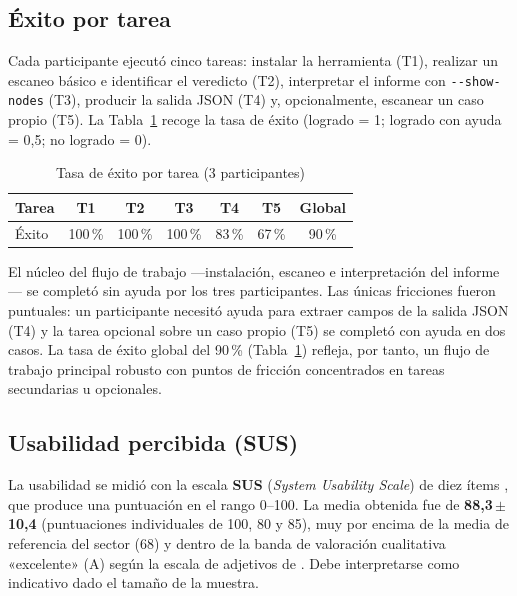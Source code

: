 \subsection{Éxito por tarea}

Cada participante ejecutó cinco tareas: instalar la herramienta (T1), realizar un
escaneo básico e identificar el veredicto (T2), interpretar el informe con
\texttt{-{}-show-nodes} (T3), producir la salida \ac{JSON} (T4) y, opcionalmente,
escanear un caso propio (T5). La Tabla~\ref{tab:usab_tareas} recoge la tasa de
éxito (logrado = 1; logrado con ayuda = 0,5; no logrado = 0).

\begin{table}[htbp]
\centering
\caption{Tasa de éxito por tarea (3 participantes)}
\label{tab:usab_tareas}
\begin{tabular}{@{}lccccc c@{}}
\toprule
Tarea & T1 & T2 & T3 & T4 & T5 & Global \\
\midrule
Éxito & 100\,\% & 100\,\% & 100\,\% & 83\,\% & 67\,\% & 90\,\% \\
\bottomrule
\end{tabular}
\fuentepropia
\end{table}

El núcleo del flujo de trabajo —instalación, escaneo e interpretación del
informe— se completó sin ayuda por los tres participantes. Las únicas fricciones
fueron puntuales: un participante necesitó ayuda para extraer campos de la salida
\ac{JSON} (T4) y la tarea opcional sobre un caso propio (T5) se completó con
ayuda en dos casos. La tasa de éxito global del 90\,\% (Tabla~\ref{tab:usab_tareas})
refleja, por tanto, un flujo de trabajo principal robusto con puntos de fricción
concentrados en tareas secundarias u opcionales.

\subsection{Usabilidad percibida (SUS)}

La usabilidad se midió con la escala \textbf{SUS} (\textit{System Usability
Scale}) de diez ítems \citep{Brooke1996}, que produce una puntuación en el rango
0--100. La media obtenida fue de \textbf{88,3\,\(\pm\)\,10,4} (puntuaciones
individuales de 100, 80 y 85), muy por encima de la media de referencia del
sector (68) y dentro de la banda de valoración cualitativa «excelente» (A) según
la escala de adjetivos de \citet{Bangor2009}. Debe interpretarse como indicativo
dado el tamaño de la muestra.

